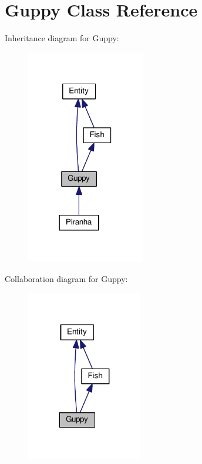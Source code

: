 \hypertarget{classGuppy}{}\section{Guppy Class Reference}
\label{classGuppy}


Inheritance diagram for Guppy\+:
\nopagebreak
\begin{figure}[H]
\begin{center}
\leavevmode
\includegraphics[width=146pt]{classGuppy__inherit__graph}
\end{center}
\end{figure}


Collaboration diagram for Guppy\+:
\nopagebreak
\begin{figure}[H]
\begin{center}
\leavevmode
\includegraphics[width=143pt]{classGuppy__coll__graph}
\end{center}
\end{figure}
